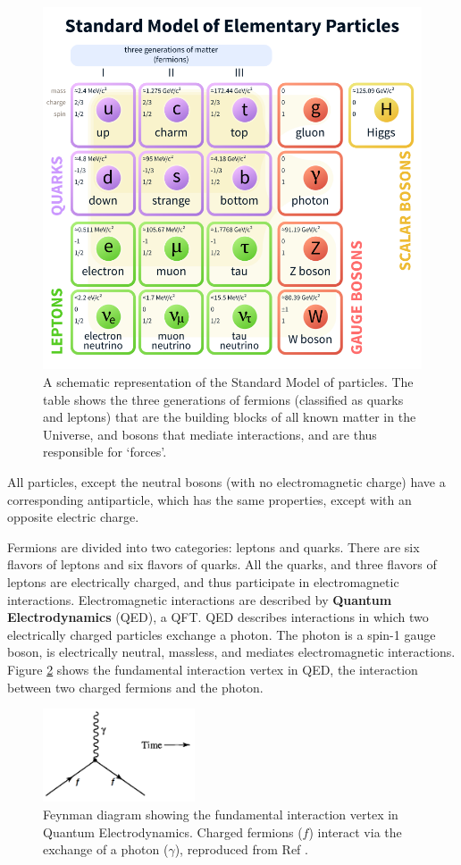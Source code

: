 \documentclass[12pt,a4paper,openright,twoside]{report}
\begin{document}
\begin{figure}[H]
\centering
\includegraphics[width=0.8\linewidth]{standard_model.png}
\caption{A schematic representation of the Standard Model\cite{SM} of particles. The table shows the three generations of fermions (classified as quarks and leptons) that are the building blocks of all known matter in the Universe, and bosons that mediate interactions, and are thus responsible for `forces'.}
\label{fig:SM}
\end{figure}

All particles, except the neutral bosons (with no electromagnetic charge) have a corresponding antiparticle, which has the same properties, except with an opposite electric charge.

Fermions are divided into two categories: leptons and quarks. There are six flavors of leptons and six flavors of quarks. All the quarks, and three flavors of leptons are electrically charged, and thus participate in electromagnetic interactions. Electromagnetic interactions are described by \textbf{Quantum Electrodynamics} (QED)\cite{QED}, a QFT. QED describes interactions in which two electrically charged particles exchange a photon. The photon is a spin-1 gauge boson, is electrically neutral, massless, and mediates electromagnetic interactions. Figure \ref{fig:qed_fund_vertex} shows the fundamental interaction vertex in QED, the interaction between two charged fermions and the photon.

\begin{figure}[H]
\centering
\includegraphics[width = 0.4\textwidth]{fundamental_vertex_qed.png}
\caption{Feynman diagram showing the fundamental interaction vertex in Quantum Electrodynamics. Charged fermions ($f$) interact via the exchange of a photon ($\gamma$), reproduced from Ref \cite{griff}.}
\label{fig:qed_fund_vertex}
\end{figure}
\end{document}
